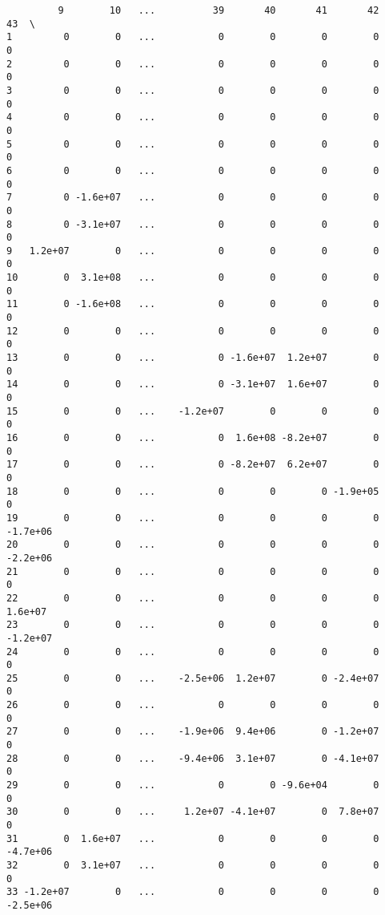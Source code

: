 \documentclass{article}
\begin{document}
\begin{verbatim}
         9        10   ...          39       40       41       42       43  \
1         0        0   ...           0        0        0        0        0   
2         0        0   ...           0        0        0        0        0   
3         0        0   ...           0        0        0        0        0   
4         0        0   ...           0        0        0        0        0   
5         0        0   ...           0        0        0        0        0   
6         0        0   ...           0        0        0        0        0   
7         0 -1.6e+07   ...           0        0        0        0        0   
8         0 -3.1e+07   ...           0        0        0        0        0   
9   1.2e+07        0   ...           0        0        0        0        0   
10        0  3.1e+08   ...           0        0        0        0        0   
11        0 -1.6e+08   ...           0        0        0        0        0   
12        0        0   ...           0        0        0        0        0   
13        0        0   ...           0 -1.6e+07  1.2e+07        0        0   
14        0        0   ...           0 -3.1e+07  1.6e+07        0        0   
15        0        0   ...    -1.2e+07        0        0        0        0   
16        0        0   ...           0  1.6e+08 -8.2e+07        0        0   
17        0        0   ...           0 -8.2e+07  6.2e+07        0        0   
18        0        0   ...           0        0        0 -1.9e+05        0   
19        0        0   ...           0        0        0        0 -1.7e+06   
20        0        0   ...           0        0        0        0 -2.2e+06   
21        0        0   ...           0        0        0        0        0   
22        0        0   ...           0        0        0        0  1.6e+07   
23        0        0   ...           0        0        0        0 -1.2e+07   
24        0        0   ...           0        0        0        0        0   
25        0        0   ...    -2.5e+06  1.2e+07        0 -2.4e+07        0   
26        0        0   ...           0        0        0        0        0   
27        0        0   ...    -1.9e+06  9.4e+06        0 -1.2e+07        0   
28        0        0   ...    -9.4e+06  3.1e+07        0 -4.1e+07        0   
29        0        0   ...           0        0 -9.6e+04        0        0   
30        0        0   ...     1.2e+07 -4.1e+07        0  7.8e+07        0   
31        0  1.6e+07   ...           0        0        0        0 -4.7e+06   
32        0  3.1e+07   ...           0        0        0        0        0   
33 -1.2e+07        0   ...           0        0        0        0 -2.5e+06   

\end{verbatim}
\end{document}
